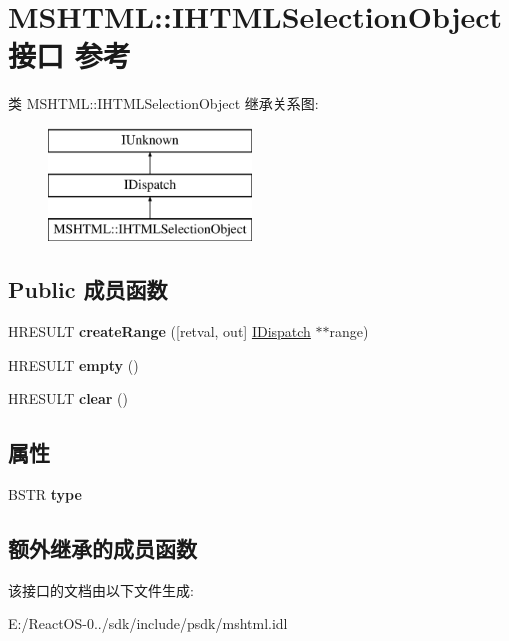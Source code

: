 \hypertarget{interface_m_s_h_t_m_l_1_1_i_h_t_m_l_selection_object}{}\section{M\+S\+H\+T\+ML\+:\+:I\+H\+T\+M\+L\+Selection\+Object接口 参考}
\label{interface_m_s_h_t_m_l_1_1_i_h_t_m_l_selection_object}
类 M\+S\+H\+T\+ML\+:\+:I\+H\+T\+M\+L\+Selection\+Object 继承关系图\+:\begin{figure}[H]
\begin{center}
\leavevmode
\includegraphics[height=3.000000cm]{interface_m_s_h_t_m_l_1_1_i_h_t_m_l_selection_object}
\end{center}
\end{figure}
\subsection*{Public 成员函数}
\begin{DoxyCompactItemize}
\item 
\mbox{\label{interface_m_s_h_t_m_l_1_1_i_h_t_m_l_selection_object_a82b825a9b29dba0bc2b122c6293321fe}} 
H\+R\+E\+S\+U\+LT {\bfseries create\+Range} (\mbox{[}retval, out\mbox{]} \hyperlink{interface_i_dispatch}{I\+Dispatch} $\ast$$\ast$range)
\item 
\mbox{\label{interface_m_s_h_t_m_l_1_1_i_h_t_m_l_selection_object_a4bc560f722aeb85ace36a23a973e7d2e}} 
H\+R\+E\+S\+U\+LT {\bfseries empty} ()
\item 
\mbox{\label{interface_m_s_h_t_m_l_1_1_i_h_t_m_l_selection_object_a419e01fcbf15ed35f3d8a96bba926b3a}} 
H\+R\+E\+S\+U\+LT {\bfseries clear} ()
\end{DoxyCompactItemize}
\subsection*{属性}
\begin{DoxyCompactItemize}
\item 
\mbox{\label{interface_m_s_h_t_m_l_1_1_i_h_t_m_l_selection_object_a450b47d736c88b231b64996b747ac00d}} 
B\+S\+TR {\bfseries type}
\end{DoxyCompactItemize}
\subsection*{额外继承的成员函数}


该接口的文档由以下文件生成\+:\begin{DoxyCompactItemize}
\item 
E\+:/\+React\+O\+S-\/0../sdk/include/psdk/mshtml.\+idl\end{DoxyCompactItemize}
